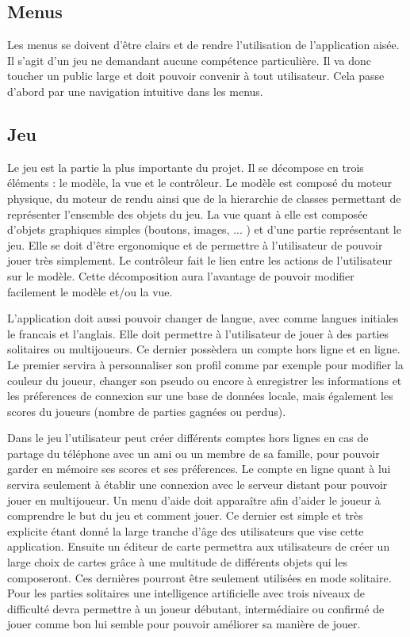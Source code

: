 \subsection{Menus}
		
	Les menus se doivent d'être clairs et de rendre l'utilisation de
	l'application aisée. Il s'agit d'un jeu ne demandant aucune compétence
	particulière. Il va donc toucher un public large et doit pouvoir convenir à
	tout utilisateur. Cela passe d'abord par une navigation intuitive dans les
	menus.
		
\subsection{Jeu}
		
	Le jeu est la partie la plus importante du projet. 
	Il se décompose en trois éléments : le modèle, la vue et le contrôleur. 
	Le modèle est composé du moteur physique, du moteur de rendu ainsi que de la
	hierarchie de classes permettant de représenter l'ensemble des objets du jeu. 
	La vue quant à elle est composée d'objets graphiques simples (boutons, images, ... ) 
	et d'une partie représentant le jeu. Elle se doit d'être ergonomique et de permettre
	à l'utilisateur de pouvoir jouer très simplement. Le contrôleur fait
	le lien entre les actions de l'utilisateur sur le modèle. Cette décomposition aura
	l'avantage de pouvoir modifier facilement le modèle et/ou la vue.
		
	L'application doit aussi pouvoir changer de langue, avec comme langues initiales le francais et l'anglais.
	Elle doit permettre à l'utilisateur de jouer à des parties solitaires ou multijoueurs. 
	Ce dernier possèdera un compte hors ligne et en ligne.		
	Le premier servira à personnaliser son profil comme par exemple pour modifier
	la couleur du joueur, changer son pseudo ou encore à enregistrer les informations
	et les préferences de connexion sur une base de données locale,
	mais également les scores du joueurs (nombre de parties gagnées ou perdus).
	
	Dans le jeu l'utilisateur peut créer différents comptes hors lignes en cas de partage du téléphone
	avec un ami ou un membre de sa famille, pour pouvoir garder en mémoire ses scores et ses préferences.		
	Le compte en ligne quant à lui servira seulement à établir une connexion avec le serveur distant pour pouvoir jouer en multijoueur.		
	Un menu d'aide doit apparaître afin d'aider le joueur à comprendre le but du jeu et comment jouer. 
	Ce dernier est simple et très explicite étant donné la large tranche d'âge des utilisateurs que vise cette application.		
	Ensuite un éditeur de carte permettra aux utilisateurs de créer un large choix de cartes
	grâce à une multitude de différents objets qui les composeront. Ces dernières pourront être seulement utilisées en mode solitaire.
	Pour les parties solitaires une intelligence artificielle avec trois niveaux de difficulté 
	devra permettre à un joueur débutant, intermédiaire ou confirmé de jouer comme bon lui semble pour pouvoir améliorer sa manière de jouer.
	
